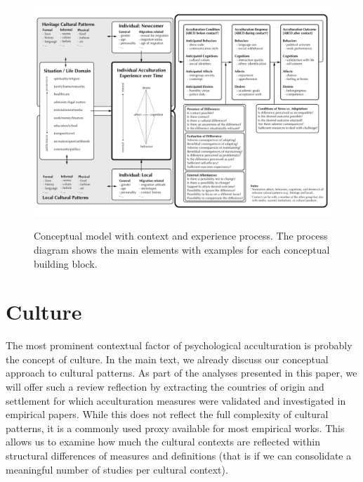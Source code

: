 \documentclass[man, 12pt, a4paper]{apa7}
\begin{document}
\begin{figure}
    \centering
    \caption{Conceptual model with context and experience process. The process diagram shows the main elements with examples for each conceptual building block.}
    \includegraphics[width=\textwidth]{Figures/ConceptualFrameworkExpandedOptima_Revision.pdf}
    \label{fig:SupModelContext}
\end{figure}

\section{Culture} 
The most prominent contextual factor of psychological acculturation is probably the concept of culture. In the main text, we already discuss our conceptual approach to cultural patterns. As part of the analyses presented in this paper, we will offer such a review reflection by extracting the countries of origin and settlement for which acculturation measures were validated and investigated in empirical papers. While this does not reflect the full complexity of cultural patterns, it is a commonly used proxy available for most empirical works. This allows us to examine how much the cultural contexts are reflected within structural differences of measures and definitions (that is if we can consolidate a meaningful number of studies per cultural context).
\end{document}
